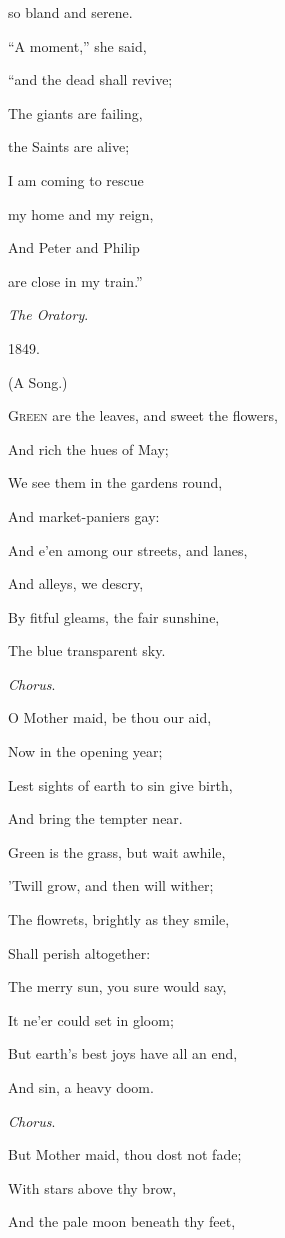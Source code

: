 so bland and serene.

``A moment,'' she said,

``and the dead shall revive;

The giants are failing,

the Saints are alive;

I am coming to rescue

my home and my reign,

And Peter and Philip

are close in my train.''

\emph{The Oratory}.

1849.


(A Song.)

G\textsc{reen} are the leaves, and sweet the flowers,

And rich the hues of May;

We see them in the gardens round,

And market-paniers gay:

And e'en among our streets, and lanes,

And alleys, we descry,

By fitful gleams, the fair sunshine,

The blue transparent sky.

\emph{Chorus}.

O Mother maid, be thou our aid,

Now in the opening year;

Lest sights of earth to sin give birth,

And bring the tempter near. 

Green is the grass, but wait awhile,

'Twill grow, and then will wither;

The flowrets, brightly as they smile,

Shall perish altogether:

The merry sun, you sure would say,

It ne'er could set in gloom;

But earth's best joys have all an end,

And sin, a heavy doom.

\emph{Chorus}.

But Mother maid, thou dost not fade;

With stars above thy brow,

And the pale moon beneath thy feet,

